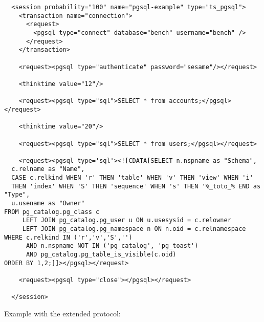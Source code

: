 \documentclass{TSUNG-en}
\begin{document}
\begin{Verbatim}
  <session probability="100" name="pgsql-example" type="ts_pgsql">
    <transaction name="connection">
      <request>
        <pgsql type="connect" database="bench" username="bench" />
      </request>
    </transaction>

    <request><pgsql type="authenticate" password="sesame"/></request>

    <thinktime value="12"/>

    <request><pgsql type="sql">SELECT * from accounts;</pgsql></request>

    <thinktime value="20"/>

    <request><pgsql type="sql">SELECT * from users;</pgsql></request>

    <request><pgsql type='sql'><![CDATA[SELECT n.nspname as "Schema",
  c.relname as "Name",
  CASE c.relkind WHEN 'r' THEN 'table' WHEN 'v' THEN 'view' WHEN 'i'
  THEN 'index' WHEN 'S' THEN 'sequence' WHEN 's' THEN '%_toto_% END as "Type",
  u.usename as "Owner"
FROM pg_catalog.pg_class c
     LEFT JOIN pg_catalog.pg_user u ON u.usesysid = c.relowner
     LEFT JOIN pg_catalog.pg_namespace n ON n.oid = c.relnamespace
WHERE c.relkind IN ('r','v','S','')
      AND n.nspname NOT IN ('pg_catalog', 'pg_toast')
      AND pg_catalog.pg_table_is_visible(c.oid)
ORDER BY 1,2;]]></pgsql></request>

    <request><pgsql type="close"></pgsql></request>

  </session>
\end{Verbatim}

Example with the extended protocol:
\end{document}
